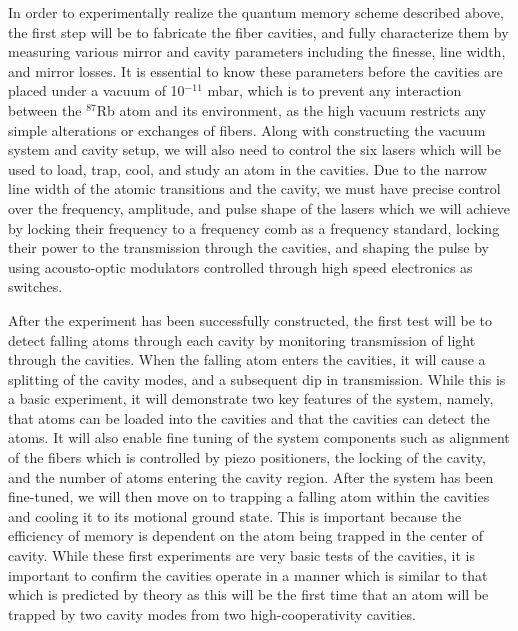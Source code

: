 \documentclass[a4paper]{article}
\begin{document}
\indent\indent In order to experimentally realize the quantum memory scheme described above, the first step will be to fabricate the fiber cavities, and fully characterize them by measuring various mirror and cavity parameters including the finesse, line width, and mirror losses. It is essential to know these parameters before the cavities are placed under a vacuum of 10$^{-11}$ mbar, which is to prevent any interaction between the $^{87}$Rb atom and its environment, as the high vacuum restricts any simple alterations or exchanges of fibers. Along with constructing the vacuum system and cavity setup, we will also need to control the six lasers which will be used to load, trap, cool, and study an atom in the cavities. Due to the narrow line width of the atomic transitions and the cavity, we must have precise control over the frequency, amplitude, and pulse shape of the lasers which we will achieve by locking their frequency to a frequency comb as a frequency standard, locking their power to the transmission through the cavities, and shaping the pulse by using acousto-optic modulators controlled through high speed electronics as switches.

After the experiment has been successfully constructed, the first test will be to detect falling atoms through each cavity by monitoring transmission of light through the cavities. When the falling atom enters the cavities, it will cause a splitting of the cavity modes, and a subsequent dip in transmission. While this is a basic experiment, it will demonstrate two key features of the system, namely, that atoms can be loaded into the cavities and that the cavities can detect the atoms. It will also enable fine tuning of the system components such as alignment of the fibers which is controlled by piezo positioners, the locking of the cavity, and the number of atoms entering the cavity region. After the system has been fine-tuned, we will then move on to trapping a falling atom within the cavities and cooling it to its motional ground state. This is important because the efficiency of memory is dependent on the atom being trapped in the center of cavity. While these first experiments are very basic tests of the cavities, it is important to confirm the cavities operate in a manner which is similar to that which is predicted by theory as this will be the first time that an atom will be trapped by two cavity modes from two high-cooperativity cavities.
\end{document}
